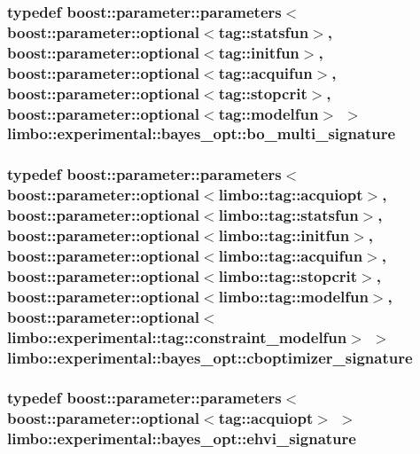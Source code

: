 \subsubsection[{bo\+\_\+multi\+\_\+signature}]{\setlength{\rightskip}{0pt plus 5cm}typedef boost\+::parameter\+::parameters$<$boost\+::parameter\+::optional$<$tag\+::statsfun$>$, boost\+::parameter\+::optional$<$tag\+::initfun$>$, boost\+::parameter\+::optional$<$tag\+::acquifun$>$, boost\+::parameter\+::optional$<$tag\+::stopcrit$>$, boost\+::parameter\+::optional$<$tag\+::modelfun$>$ $>$ {\bf limbo\+::experimental\+::bayes\+\_\+opt\+::bo\+\_\+multi\+\_\+signature}}\label{namespacelimbo_1_1experimental_1_1bayes__opt_a917a3d4ba3c92a91c3664f9e3ab91057}
\hypertarget{namespacelimbo_1_1experimental_1_1bayes__opt_a5b88cfb36e71acb407ac2258966e57b1}{}
\subsubsection[{cboptimizer\+\_\+signature}]{\setlength{\rightskip}{0pt plus 5cm}typedef boost\+::parameter\+::parameters$<$boost\+::parameter\+::optional$<$limbo\+::tag\+::acquiopt$>$, boost\+::parameter\+::optional$<$limbo\+::tag\+::statsfun$>$, boost\+::parameter\+::optional$<$limbo\+::tag\+::initfun$>$, boost\+::parameter\+::optional$<$limbo\+::tag\+::acquifun$>$, boost\+::parameter\+::optional$<$limbo\+::tag\+::stopcrit$>$, boost\+::parameter\+::optional$<$limbo\+::tag\+::modelfun$>$, boost\+::parameter\+::optional$<$limbo\+::experimental\+::tag\+::constraint\+\_\+modelfun$>$ $>$ {\bf limbo\+::experimental\+::bayes\+\_\+opt\+::cboptimizer\+\_\+signature}}\label{namespacelimbo_1_1experimental_1_1bayes__opt_a5b88cfb36e71acb407ac2258966e57b1}
\hypertarget{namespacelimbo_1_1experimental_1_1bayes__opt_aa9273d3d9c89937c8da1850d0174d3ff}{}
\subsubsection[{ehvi\+\_\+signature}]{\setlength{\rightskip}{0pt plus 5cm}typedef boost\+::parameter\+::parameters$<$boost\+::parameter\+::optional$<$tag\+::acquiopt$>$ $>$ {\bf limbo\+::experimental\+::bayes\+\_\+opt\+::ehvi\+\_\+signature}}\label{namespacelimbo_1_1experimental_1_1bayes__opt_aa9273d3d9c89937c8da1850d0174d3ff}
\hypertarget{namespacelimbo_1_1experimental_1_1bayes__opt_aa1bdc78504860120d6bc0f395f986f57}{}
